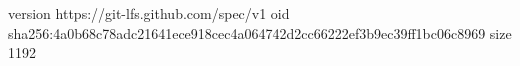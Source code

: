 version https://git-lfs.github.com/spec/v1
oid sha256:4a0b68c78adc21641ece918cec4a064742d2cc66222ef3b9ec39ff1bc06c8969
size 1192
